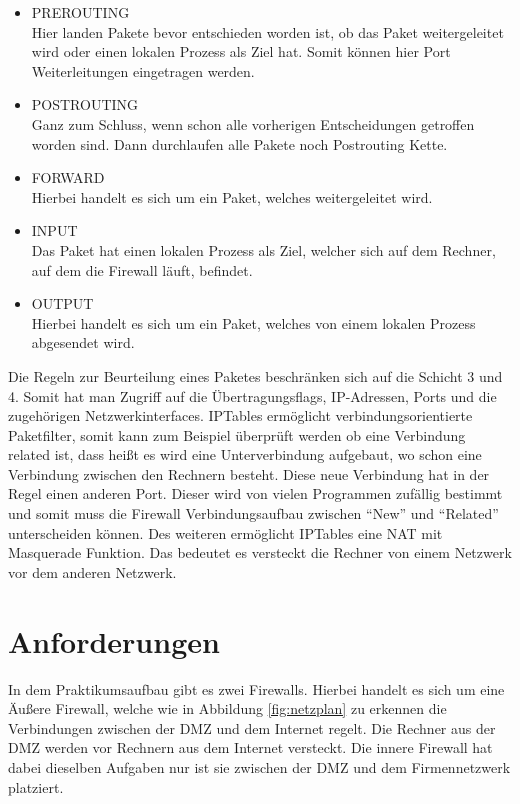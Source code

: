\begin{itemize}
	\item PREROUTING \\
	Hier landen Pakete bevor entschieden worden ist, ob das Paket weitergeleitet wird oder einen lokalen Prozess als Ziel hat. Somit können hier Port Weiterleitungen eingetragen werden.
	\item POSTROUTING \\
	Ganz zum Schluss, wenn schon alle vorherigen Entscheidungen getroffen worden sind. Dann durchlaufen alle Pakete noch Postrouting Kette.
	\item FORWARD \\
	Hierbei handelt es sich um ein Paket, welches weitergeleitet wird.
	\item INPUT \\
	Das Paket hat einen lokalen Prozess als Ziel, welcher sich auf dem Rechner, auf dem die Firewall läuft, befindet.
	\item OUTPUT \\
	Hierbei handelt es sich um ein Paket, welches von einem lokalen Prozess abgesendet wird.
\end{itemize}
Die Regeln zur Beurteilung eines Paketes beschränken sich auf die Schicht 3 und 4. Somit hat man Zugriff auf die Übertragungsflags, IP-Adressen, Ports und die zugehörigen Netzwerkinterfaces. IPTables ermöglicht verbindungsorientierte Paketfilter, somit kann zum Beispiel überprüft werden ob eine Verbindung related ist, dass heißt es wird eine Unterverbindung aufgebaut, wo schon eine Verbindung zwischen den Rechnern besteht. Diese neue Verbindung hat in der Regel einen anderen Port. Dieser wird von vielen Programmen zufällig bestimmt und somit muss die Firewall Verbindungsaufbau zwischen "`New"' und "`Related"' unterscheiden können. Des weiteren ermöglicht IPTables eine NAT mit Masquerade Funktion. Das bedeutet es versteckt die Rechner von einem Netzwerk vor dem anderen Netzwerk.

\section{Anforderungen}
In dem Praktikumsaufbau gibt es zwei Firewalls. Hierbei handelt es sich um eine Äußere Firewall, welche wie in Abbildung \ref{fig:netzplan} zu erkennen die Verbindungen zwischen der DMZ und dem Internet regelt. Die Rechner aus der DMZ werden vor Rechnern aus dem Internet versteckt. Die innere Firewall hat dabei dieselben Aufgaben nur ist sie zwischen der DMZ und dem Firmennetzwerk platziert.

